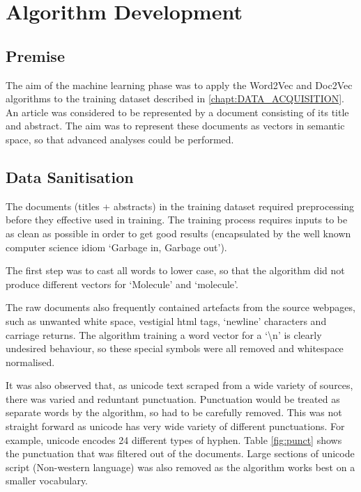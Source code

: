 \chapter{Algorithm Development}
\label{chapt:ALGORITHM}
\section{Premise}
The aim of the machine learning phase was to apply the Word2Vec and Doc2Vec algorithms to the training dataset described in \ref{chapt:DATA_ACQUISITION}. An article was considered to be represented by a document consisting of its title and abstract. The aim was to represent these documents as vectors in semantic space, so that advanced analyses could be performed. 
\section{Data Sanitisation}
The documents (titles + abstracts) in the training dataset required preprocessing before  they effective used in training. The training process requires inputs to be as clean as possible in order to get good results (encapsulated by the well known computer science idiom `Garbage in, Garbage out'). 

The first step was to cast all words to lower case, so that the algorithm did not produce different vectors for `Molecule' and `molecule'.

The raw documents also frequently contained artefacts from the source webpages, such as unwanted white space, vestigial html tags, `newline' characters and carriage returns. The algorithm training a word vector for a `\textbackslash n' is clearly undesired behaviour, so these special symbols were all removed and whitespace normalised.

It was also observed that, as unicode text scraped from a wide variety of sources, there was varied and reduntant punctuation. Punctuation would be treated as separate words by the algorithm, so had to be carefully removed. This was not straight forward as unicode has very wide variety of different punctuations. For example, unicode encodes 24 different types of hyphen. Table \ref{fig:punct} shows the punctuation that was filtered out of the documents. Large sections of unicode script (Non-western language) was also removed as the algorithm works best on a smaller vocabulary.

